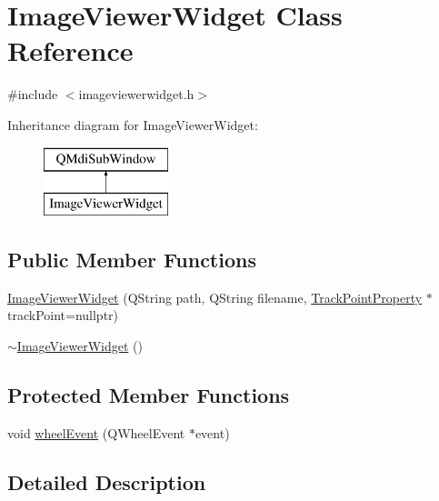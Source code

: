 \hypertarget{class_image_viewer_widget}{}\section{Image\+Viewer\+Widget Class Reference}
\label{class_image_viewer_widget}


{\ttfamily \#include $<$imageviewerwidget.\+h$>$}

Inheritance diagram for Image\+Viewer\+Widget\+:\begin{figure}[H]
\begin{center}
\leavevmode
\includegraphics[height=2.000000cm]{class_image_viewer_widget}
\end{center}
\end{figure}
\subsection*{Public Member Functions}
\begin{DoxyCompactItemize}
\item 
\mbox{\hyperlink{class_image_viewer_widget_a3ac9e23f6d399afb408d9e5f4346f0ca}{Image\+Viewer\+Widget}} (Q\+String path, Q\+String filename, \mbox{\hyperlink{struct_track_point_property}{Track\+Point\+Property}} $\ast$track\+Point=nullptr)
\item 
\mbox{\hyperlink{class_image_viewer_widget_a9a0a76880c98934a048b8c787583d181}{$\sim$\+Image\+Viewer\+Widget}} ()
\end{DoxyCompactItemize}
\subsection*{Protected Member Functions}
\begin{DoxyCompactItemize}
\item 
void \mbox{\hyperlink{class_image_viewer_widget_ad299df10dddc344004fe170af436b88e}{wheel\+Event}} (Q\+Wheel\+Event $\ast$event)
\end{DoxyCompactItemize}


\subsection{Detailed Description}



